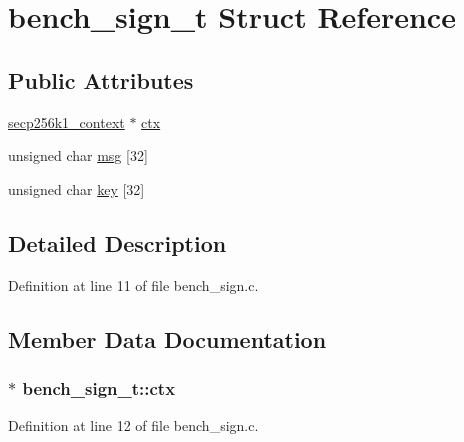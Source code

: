 \hypertarget{structbench__sign__t}{}\section{bench\+\_\+sign\+\_\+t Struct Reference}
\label{structbench__sign__t}
\subsection*{Public Attributes}
\begin{DoxyCompactItemize}
\item 
\hyperlink{secp256k1_8h_a282ec9e6dfec8c35955c3eb2f7476e5e}{secp256k1\+\_\+context} $\ast$ \hyperlink{structbench__sign__t_ae16684ae6cff7c19bf558e5a0204b9ea}{ctx}
\item 
unsigned char \hyperlink{structbench__sign__t_a8710d756cc35409f8c230a89b9a52f71}{msg} \mbox{[}32\mbox{]}
\item 
unsigned char \hyperlink{structbench__sign__t_ae58b8838304b713a59437d4ec87b15d8}{key} \mbox{[}32\mbox{]}
\end{DoxyCompactItemize}


\subsection{Detailed Description}


Definition at line 11 of file bench\+\_\+sign.\+c.



\subsection{Member Data Documentation}
\hypertarget{structbench__sign__t_ae16684ae6cff7c19bf558e5a0204b9ea}{}
\subsubsection[{ctx}]{$\ast$ bench\+\_\+sign\+\_\+t\+::ctx}\label{structbench__sign__t_ae16684ae6cff7c19bf558e5a0204b9ea}


Definition at line 12 of file bench\+\_\+sign.\+c.

\hypertarget{structbench__sign__t_ae58b8838304b713a59437d4ec87b15d8}{}

